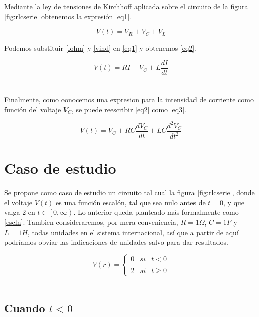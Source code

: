 \documentclass[letterpaper,12pt]{article} %
\begin{document}
Mediante la ley de tensiones de Kirchhoff aplicada sobre el circuito de la figura \ref{fig:rlcserie} obtenemos la expresión \eqref{eq1}.

\begin{equation}
V(t)=V_R+V_C+V_L
\label{eq1}
\end{equation}

Podemos substituir \eqref{lohm} y \eqref{vind} en \eqref{eq1} y obtenemos \eqref{eq2}.

\begin{equation}
V(t)=RI+V_C+L\frac{dI}{dt}
\label{eq2}
\end{equation}
\\ \\

Finalmente, como conocemos una expresion para la intensidad de corriente como función del voltaje $V_C$, se puede reescribir \eqref{eq2} como \eqref{eq3}.

\begin{equation}
V(t)=V_C + RC\frac{dV_C}{dt} + LC\frac{d^2V_C}{dt^2}
\label{eq3}
\end{equation}

\section*{Caso de estudio}

Se propone como caso de estudio un circuito tal cual la figura \ref{fig:rlcserie}, donde el voltaje $V(t)$ es una función escalón, tal que sea nulo antes de $t=0$, y que valga $2$ en $t\in\left[0,\infty\right)$. Lo anterior queda planteado más formalmente como \eqref{escln}. Tambien consideraremos, por mera conveniencia, $R=1\Omega$, $C=1F$ y $L=1H$, todas unidades en el sistema internacional, así que a partir de aquí podríamos obviar las indicaciones de unidades salvo para dar resultados.

\begin{equation}
V(r)= \left\{ \begin{array}{lcc}
            0 &   si  & t < 0 \\
            \\2 &   si  & t\geq 0
             \end{array}
   \right.
\label{escln}
\end{equation}
\\

\subsection*{Cuando $t<0$}
\end{document}
